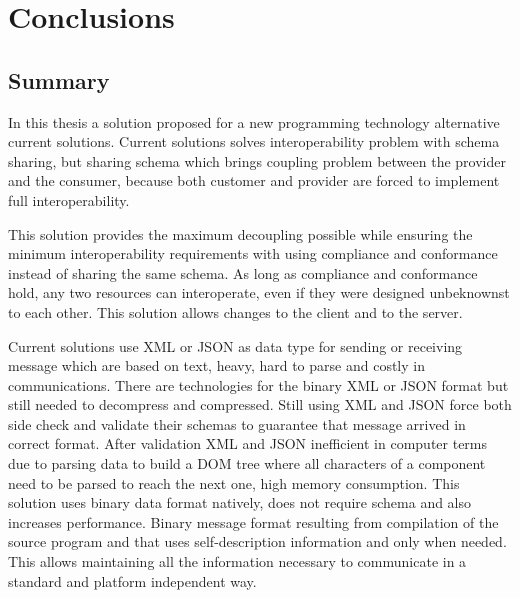 
\chapter{Conclusions}
\label{chapter:conclusions}

\section{Summary}
\label{section:summary}

In this thesis a solution proposed for a new programming technology alternative current solutions. Current solutions solves interoperability problem with schema sharing, but sharing schema which brings coupling problem between the provider and the consumer, because both customer and provider are forced to implement full interoperability.

This solution provides the maximum decoupling possible while ensuring the minimum interoperability requirements with using compliance and conformance instead of sharing the same schema. As long as compliance and conformance hold, any two resources can interoperate, even if they were designed unbeknownst to each other. This solution allows changes to the client and to the server.

Current solutions use XML or JSON as data type for sending or receiving message which are based on text, heavy, hard to parse and costly in communications. There are technologies for the binary XML or JSON format but still needed to decompress and compressed. Still using XML and JSON force both side check and validate their schemas to guarantee that message arrived in correct format. After validation XML and JSON inefficient in computer terms due to parsing data to build a DOM tree where all characters of a component need to be parsed to reach the next one, high memory consumption. This solution uses binary data format natively, does not require schema and also increases performance. Binary message format resulting from compilation of the source program and that uses self-description information and only when needed. This allows  maintaining all the information necessary to communicate in a standard and platform independent way.

